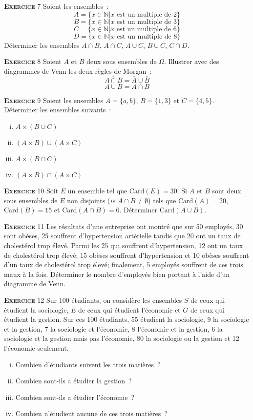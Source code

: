 \documentclass[10pt,a4paper,notitlepage]{article}
\newcommand{\exercice}[1]{\textsc{\textbf{Exercice}} #1}
\begin{document}
\bigskip

\exercice{7} Soient les ensembles~:
\[
A = \{x \in \mathbb N | x \text{ est un multiple de 2}\}
\]
\[
B = \{x \in \mathbb N | x \text{ est un multiple de 3}\}
\]
\[
C = \{x \in \mathbb N | x \text{ est un multiple de 6}\}
\]
\[
D = \{x \in \mathbb N | x \text{ est un multiple de 8}\}
\]
Déterminer les ensembles $A \cap B$, $A \cap C$, $A \cup C$, $B\cup
C$, $C\cap D$.

\bigskip

\exercice{8} Soient $A$ et $B$ deux sous ensembles de
$\Omega$. Illustrer avec des diagrammes de Venn les deux règles de
Morgan~:
\[
\overline{A \cap B} = \overline{A} \cup \overline{B}
\]
\[
\overline{A \cup B} = \overline{A} \cap \overline{B}
\]

\bigskip

\exercice{9} Soient les ensembles $A = \{a, b\}$, $B = \{1, 3\}$ et $C
= \{4, 5\}$. Déterminer les ensembles suivants~:
\begin{enumerate}[(i)]
\item $A \times (B\cup C)$
\item $(A\times B) \cup (A\times C)$
\item $A \times (B \cap C)$
\item $(A\times B) \cap (A\times C)$
\end{enumerate}

\bigskip

\exercice{10} Soit $E$ un ensemble tel que $\mathrm{Card}(E)=30$. Si
$A$ et $B$ sont deux sous ensembles de $E$ non disjoints (\emph{ie}
$A\cap B \neq \emptyset$) tels que $\mathrm{Card}(A)=20$,
$\mathrm{Card}(B)=15$ et $\mathrm{Card}(A\cap B)=6$. Déterminer
$\mathrm{Card}(A\cup B)$.

\bigskip

\exercice{11} Les résultats d'une entreprise ont montré que sur 50
employés, 30 sont obèses, 25 souffrent d'hypertension artérielle
tandis que 20 ont un taux de cholestérol trop élevé. Parmi les 25 qui
souffrent d'hypertension, 12 ont un taux de cholestérol trop élevé; 15
obèses souffrent d'hypertension et 10 obèses souffrent d'un taux de
cholestérol trop élevé; finalement, 5 employés souffrent de ces
trois maux à la fois.  Déterminer le nombre d'employés bien portant à
l'aide d'un diagramme de Venn.

\bigskip

\exercice{12}  Sur 100 étudiants, on considère les ensembles $S$ de ceux qui étudient
la sociologie, $E$ de ceux qui étudient l'économie et $G$ de ceux qui étudient la gestion. Sur ces 100 étudiants, 55 étudient la sociologie, 9 la
sociologie et la gestion, 7 la sociologie et l'économie, 8 l'économie et la
gestion, 6 la sociologie et la gestion mais pas l'économie, 80 la sociologie
ou la gestion et 12 l'économie seulement.
\begin{enumerate}[(i)]
\item Combien d'étudiants suivent les trois matières ?
\item Combien sont-ils a étudier la gestion ?
\item Combien sont-ils a étudier l'économie ?
\item Combien n'étudient aucune de ces trois matières ?
\end{enumerate}
\end{document}
